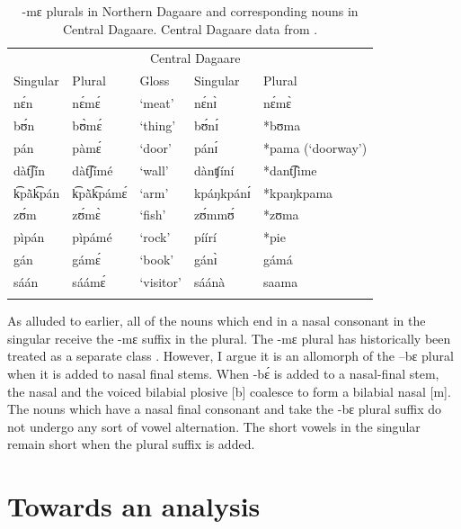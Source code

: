 \documentclass[output=paper,colorlinks,citecolor=brown,
]{langscibook}
\begin{document}
\begin{table}

  \caption{-mɛ plurals in Northern Dagaare and corresponding nouns in Central Dagaare. Central Dagaare data from \cite{aliDictionary2021}.}
  \label{tab:Caragine:bePluralNasal}
  
\begin{tabular}{lllll}
\lsptoprule 
\multicolumn{2}{c}{Northern Dagaare} & \multicolumn{1}{c}{}& \multicolumn{2}{c}{Central Dagaare}\\
Singular & Plural & Gloss 
& Singular & Plural \\
\midrule\midrule
nɛ́n & nɛ́mɛ́ & `meat' &nɛ́nɪ̀ & nɛ́mɛ̀ \citep{bodomoStructure1997}\\
bʊ́n & bʊ̀mɛ́ & `thing' &bʊ́nɪ́& *bʊma\\
pán & pàmɛ́ & `door' &pánɪ́ & *pama (`doorway')\\
dàt͡ʃín&  dàt͡ʃímé & `wall' & dànʧíní & *dant͡ʃime \\
k͡pã̀k͡pán & k͡pã̀k͡pámɛ́ & `arm' &kpáŋkpánɪ́& *kpaŋkpama \\
zʊ́m & zʊ́mɛ̀ & `fish' &zʊ́mmʊ́ & *zʊma \\
pìpán & pìpámé & `rock' &píírí& *pie \\
gán& gámɛ́ & `book' &gánɪ̀&gámá \\
sáán & sáámɛ́ & `visitor' & sáánà & saama
\citep{bodomoStructure1997}\\

\lspbottomrule 

\end{tabular}
\end{table}


As alluded to earlier, all of the nouns which end in a nasal consonant in the singular receive the -mɛ suffix in the plural. The -mɛ plural has historically been treated as a separate class \citep{bodomo2007}. However, I argue it is an allomorph of the –bɛ plural when it is added to nasal final stems. When -bɛ́ is added to a nasal-final stem, the nasal and the voiced bilabial plosive [b] coalesce to form a bilabial nasal [m]. The nouns which have a nasal final consonant and take the -bɛ plural suffix do not undergo any sort of vowel alternation. The short vowels in the singular remain short when the plural suffix is added.


\section{Towards an analysis} \label{sec:caragine:analysis}
\end{document}
